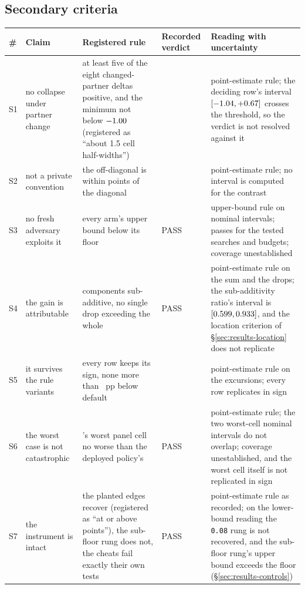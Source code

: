 \subsection*{Secondary criteria}

\begin{center}\tabfont
\begin{tabularx}{\linewidth}{@{}l Q{0.75} Q{1.15} l Q{1.1}@{}}
\toprule
\# & Claim & Registered rule & Recorded verdict & Reading with uncertainty \\
\midrule
S1 & no collapse under partner change & at least five of the eight changed-partner deltas positive,
and the minimum not below $-1.00{}$ (registered as ``about 1.5 cell half-widths'') &
\vsevenSoneVerdict{} & point-estimate rule; the deciding row's interval
$[-1.04, +0.67]$ crosses the threshold, so the verdict
is not resolved against it \\
S2 & not a private convention & the off-diagonal is within \vsevenStwoThreshold{} points of the
diagonal & \vsevenStwoVerdict{} & point-estimate rule; no interval is computed for the contrast \\
S3 & no fresh adversary exploits it & every arm's upper bound below its floor & PASS & upper-bound
rule on nominal intervals; passes for the tested searches and budgets; coverage unestablished \\
S4 & the gain is attributable & components sub-additive, no single drop exceeding the whole & PASS
& point-estimate rule on the sum and the drops; the sub-additivity ratio's interval is
$[0.599, 0.933]$, and the location criterion of
\S\ref{sec:results-location} does not replicate \\
S5 & it survives the rule variants & every row keeps its sign, none more than
\vsevenSfiveTolerance{}~pp below default & \vsevenSfiveVerdict{} & point-estimate rule on the
excursions; every row replicates in sign \\
S6 & the worst case is not catastrophic & \sestina{}'s worst panel cell no worse than the deployed
\vsix{} policy's & PASS & point-estimate rule; the two worst-cell nominal intervals do not
overlap; coverage unestablished, and the worst cell itself is not replicated in sign \\
S7 & the instrument is intact & the planted edges recover (registered as ``at or above
\vsevenPrimaryFloor{} points''), the sub-floor rung does not, the cheats fail exactly their own
tests & PASS & point-estimate rule as recorded; on the lower-bound reading the \texttt{0.08} rung is
not recovered, and the sub-floor rung's upper bound exceeds the floor (\S\ref{sec:results-controls}) \\
\bottomrule
\end{tabularx}
\end{center}


